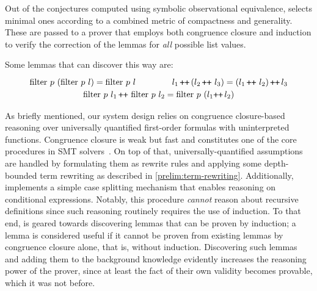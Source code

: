 Out of the conjectures computed using symbolic observational equivalence, \TheSy selects minimal ones according to a combined metric of compactness and generality.
These are passed to a prover that employs both congruence closure and induction to verify the correction of the lemmas for \emph{all} possible list values.

Some lemmas that \TheSy can discover this way are:
\[
\renewcommand\arraystretch{1.2}
\begin{array}{c}
\tfilter~p~(\tfilter~p~l) = \tfilter~p~l
 \hspace{1.5cm}
l_1 \,{\concat}\, (l_2 \,{\concat}~ l_3) = (l_1 \,{\concat}~ l_2) \,{\concat}\, l_3 \\
\tfilter~p~l_1 \concat \,\tfilter~p~l_2 =
\tfilter~p~(l_1{\concat}\,l_2)
\end{array}
\]

As briefly mentioned, our system design relies on congruence closure-based reasoning over universally quantified first-order formulas with uninterpreted functions.
Congruence closure is weak but fast and constitutes one of the core procedures in SMT solvers~\cite{egraphsnelson1980fast,IC2007:Nieuwenhuis}.
On top of that, universally-quantified assumptions~\cite{TACAS2017:Barbosa} are handled by formulating them as rewrite rules and applying some depth-bounded term rewriting as described in \autoref{prelim:term-rewriting}.
Additionally, \TheSy implements a simple case splitting mechanism that enables reasoning on conditional expressions.
Notably, this procedure \emph{cannot} reason about recursive definitions since such reasoning routinely requires the use of induction.
To that end, \TheSy is geared towards discovering lemmas that can be proven by induction; a lemma is considered useful if it cannot be proven from existing lemmas by congruence closure alone, that is, without induction.
Discovering such lemmas and adding them to the background knowledge evidently increases the reasoning power of the prover, since at least the fact of their own validity becomes provable, which it was not before.
